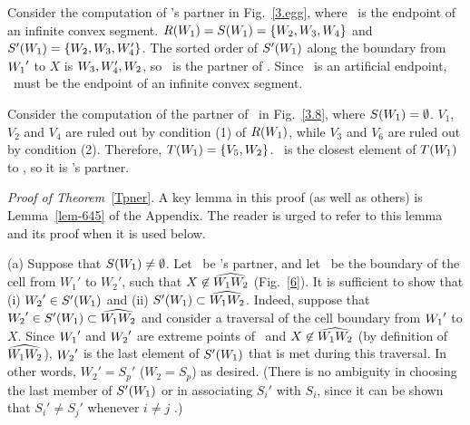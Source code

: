 \begin{example}
{\rm 
Consider the computation of \wo's partner in Fig.~\ref{3.egg}, 
where \wo\ is the endpoint of an infinite convex segment.
\mbox{$R(\mbox{$W_{1}$}) = S(\mbox{$W_{1}$}) = \{\mbox{$W_{2}$},W_{3},W_{4}\}$} and
\mbox{$S'(\mbox{$W_{1}$}) = \{\mbox{$W_{2}$},W_{3},W_{4}'\}$}.
The sorted order of $S'(\mbox{$W_{1}$})$ along the boundary from $\mbox{$W_{1}$} '$ to $X$
is $W_{3},W_{4}',\mbox{$W_{2}$}$, so \wt\ is the partner of \wo.  
Since \wt\ is an artificial endpoint, \wo\ must be the endpoint of an 
infinite convex segment.


Consider the computation of the partner of \wo\ in Fig.~\ref{3.8},
where $S(\mbox{$W_{1}$}) = \emptyset$.
$V_{1}$, $V_{2}$ and $V_{4}$ are ruled out by condition (1) of $R(\mbox{$W_{1}$})$,
while $V_{3}$ and $V_{6}$ are ruled out by condition (2).
Therefore, $T(\mbox{$W_{1}$}) = \{V_{5},W_{2}\}$.
\wt\ is the closest element of $T(\mbox{$W_{1}$})$ to \wo, so it is \wo's partner.
}
\end{example}


\par{\it Proof of Theorem}~\ref{Tpner}. \ignorespaces
A key lemma in this proof (as well as others) is Lemma~\ref{lem-645} of 
the Appendix.
The reader is urged to refer to this lemma and its proof when it is 
used below.
%
%

(a) Suppose that $S(\mbox{$W_{1}$}) \neq \emptyset$.
Let \wt\ be \wo's partner, and let \wwh\ be the boundary of the cell 
from $W_{1}'$ to $W_{2}'$, such that $X \not\in \mbox{$\widehat{W_{1}W_{2}}$}$ (Fig.~\ref{6}).
It is sufficient to show that (i) $\mbox{$W_{2}$} ' \in S'(\mbox{$W_{1}$})$ and (ii) 
$S'(\mbox{$W_{1}$}) \subset \mbox{$\widehat{W_{1}W_{2}}$}$.
Indeed, suppose that $\mbox{$W_{2}$} ' \in S'(\mbox{$W_{1}$}) \subset \mbox{$\widehat{W_{1}W_{2}}$}$
and consider a traversal of the cell boundary from $\mbox{$W_{1}$} '$ to $X$. 
Since $\mbox{$W_{1}$} '$ and $\mbox{$W_{2}$} '$ are extreme points of \wwh\ and
$X \not \in \mbox{$\widehat{W_{1}W_{2}}$}$ (by definition of $\mbox{$\widehat{W_{1}W_{2}}$}$), 
$\mbox{$W_{2}$} '$ is the last element of $S'(\mbox{$W_{1}$})$ that is met during this traversal.
In other words, $W_{2}' = S_{p}'$ ($W_{2} = S_{p}$) as desired.
(There is no ambiguity in choosing the last member of $S'(\mbox{$W_{1}$})$ or in 
associating
$S_{i}'$ with $S_{i}$, since it can be shown that $S_{i}' \neq S_{j}'$ 
whenever $i \neq j$ \cite[p. 75]{jj}.)  %

